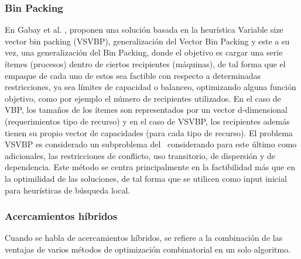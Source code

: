 \subsubsection{Bin Packing}
En Gabay et al. \cite{gabay2013variable}, proponen una solución basada en la heurística Variable size vector bin packing (VSVBP), generalización del Vector Bin Packing y este a su vez, una generalización del Bin Packing, donde el objetivo es cargar una serie ítemes (procesos) dentro de ciertos recipientes (máquinas), de tal forma que el empaque de cada uno de estos sea factible con respecto a determinadas restricciones, ya sea límites de capacidad o balanceo, optimizando alguna función objetivo, como por ejemplo el número de recipientes utilizados. En el caso de VBP, los tamaños de los ítemes son representados por un vector d-dimensional (requerimientos tipo de recurso) y en el caso de VSVBP, los recipientes además tienen su propio vector de capacidades (para cada tipo de recurso). El problema VSVBP es considerado un subproblema del \mrp\, considerando para este último como adicionales, las restricciones de conflicto, uso transitorio, de dispersión y de dependencia. Este método se centra principalmente en la factibilidad más que en la optimilidad de las soluciones, de tal forma que se utilicen como input inicial para heurísticas de búsqueda local. \\


\subsubsection{Acercamientos híbridos}
Cuando se habla de acercamientos híbridos, se refiere a la combinación de las ventajas de varios métodos de optimización combinatorial en un solo algoritmo.\\

